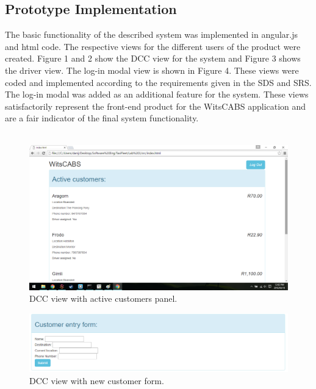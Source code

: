\documentclass[12pt]{article}
\begin{document}
\subsection{Prototype Implementation}
The basic functionality of the described system was implemented in angular.js and html code. The respective views for the different users of the product were created. Figure 1 and 2 show the DCC view for the system and Figure 3 shows the driver view. The log-in modal view is shown in Figure 4. These views were coded and implemented according to the requirements given in the SDS and SRS. The log-in modal was added as an additional feature for the system. These views satisfactorily represent the front-end product for the WitsCABS application and are a fair indicator of the final system functionality. \\\\

\begin{figure}[ht]
\centering
\includegraphics[width=1\textwidth]{DCC active panel.png}
\caption{DCC view with active customers panel.}
\end{figure}

\begin{figure}[ht]
\centering
\includegraphics[width=1\textwidth]{new customer form.png}
\caption{DCC view with new customer form.}
\end{figure}
\end{document}
